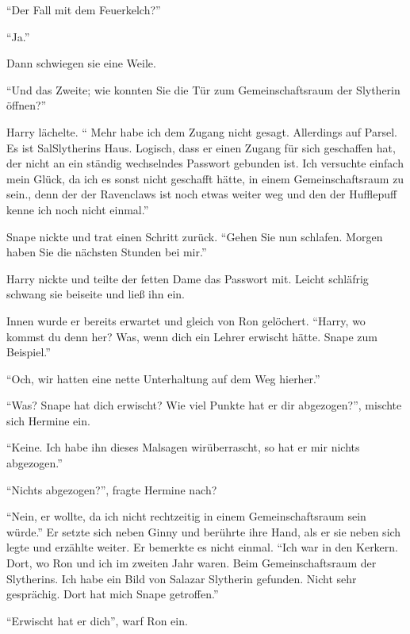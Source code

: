 \enquote{Der Fall mit dem Feuerkelch?}

\enquote{Ja.}

Dann schwiegen sie eine Weile.

\enquote{Und das Zweite; wie konnten Sie die Tür zum Gemeinschaftsraum der Slytherin öffnen?}

Harry lächelte. \enquote{ Mehr habe ich dem Zugang nicht gesagt. Allerdings auf Parsel. Es ist Sal\aabs Slytherins Haus. Logisch, dass er einen Zugang für sich geschaffen hat, der nicht an ein ständig wechselndes Passwort gebunden ist. Ich versuchte einfach mein Glück, da ich es sonst nicht geschafft hätte, in einem Gemeinschaftsraum zu sein., denn der der Ravenclaws ist noch etwas weiter weg und den der Hufflepuff kenne ich noch nicht einmal.} 

Snape nickte und trat einen Schritt zurück. \enquote{Gehen Sie nun schlafen. Morgen haben Sie die nächsten Stunden bei mir.}

Harry nickte und teilte der fetten Dame das Passwort mit. Leicht schläfrig schwang sie beiseite und ließ ihn ein.

Innen wurde er bereits erwartet und gleich von Ron gelöchert. \enquote{Harry, wo kommst du denn her? Was, wenn dich ein Lehrer erwischt hätte. Snape zum Beispiel.}

\enquote{Och, wir hatten eine nette Unterhaltung auf dem Weg hierher.}

\enquote{Was? Snape hat dich erwischt? Wie viel Punkte hat er dir abgezogen?}, mischte sich Hermine ein.

\enquote{Keine. Ich habe ihn dieses Mal\abs sagen wir\abs überrascht, so hat er mir nichts abgezogen.}

\enquote{Nichts abgezogen?}, fragte Hermine nach?

\enquote{Nein, er wollte, da ich nicht rechtzeitig in einem Gemeinschaftsraum sein würde.} Er setzte sich neben Ginny und berührte ihre Hand, als er sie neben sich legte und erzählte weiter. Er bemerkte es nicht einmal. \enquote{Ich war in den Kerkern. Dort, wo Ron und ich im zweiten Jahr waren. Beim Gemeinschaftsraum der Slytherins. Ich habe ein Bild von Salazar Slytherin gefunden. Nicht sehr gesprächig. Dort hat mich Snape getroffen.}

\enquote{Erwischt hat er dich}, warf Ron ein.

